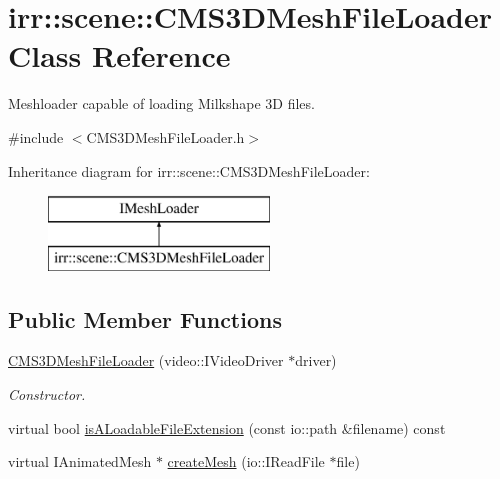 \hypertarget{classirr_1_1scene_1_1_c_m_s3_d_mesh_file_loader}{\section{irr\-:\-:scene\-:\-:C\-M\-S3\-D\-Mesh\-File\-Loader Class Reference}
\label{classirr_1_1scene_1_1_c_m_s3_d_mesh_file_loader}
}


Meshloader capable of loading Milkshape 3\-D files.  




{\ttfamily \#include $<$C\-M\-S3\-D\-Mesh\-File\-Loader.\-h$>$}

Inheritance diagram for irr\-:\-:scene\-:\-:C\-M\-S3\-D\-Mesh\-File\-Loader\-:\begin{figure}[H]
\begin{center}
\leavevmode
\includegraphics[height=2.000000cm]{classirr_1_1scene_1_1_c_m_s3_d_mesh_file_loader}
\end{center}
\end{figure}
\subsection*{Public Member Functions}
\begin{DoxyCompactItemize}
\item 
\hypertarget{classirr_1_1scene_1_1_c_m_s3_d_mesh_file_loader_ad52b4589795155476a6a63f5fccb79b8}{\hyperlink{classirr_1_1scene_1_1_c_m_s3_d_mesh_file_loader_ad52b4589795155476a6a63f5fccb79b8}{C\-M\-S3\-D\-Mesh\-File\-Loader} (video\-::\-I\-Video\-Driver $\ast$driver)}\label{classirr_1_1scene_1_1_c_m_s3_d_mesh_file_loader_ad52b4589795155476a6a63f5fccb79b8}

\begin{DoxyCompactList}\small\item\em Constructor. \end{DoxyCompactList}\item 
virtual bool \hyperlink{classirr_1_1scene_1_1_c_m_s3_d_mesh_file_loader_a060f133c067358cc54b869c557f34757}{is\-A\-Loadable\-File\-Extension} (const io\-::path \&filename) const 
\item 
virtual I\-Animated\-Mesh $\ast$ \hyperlink{classirr_1_1scene_1_1_c_m_s3_d_mesh_file_loader_a75455007a1ca4819e0d79ef803dedb4d}{create\-Mesh} (io\-::\-I\-Read\-File $\ast$file)
\end{DoxyCompactItemize}


